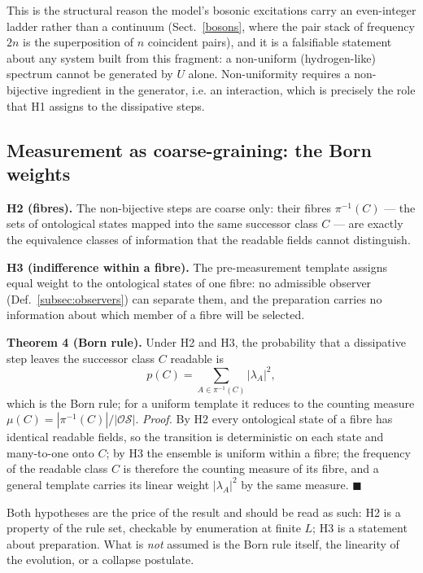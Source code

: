 This is the structural reason the model's bosonic excitations carry an
even-integer ladder rather than a continuum (Sect.~\ref{bosons}, where the pair
stack of frequency $2n$ is the superposition of $n$ coincident pairs), and it is a
falsifiable statement about any system built from this fragment: a non-uniform
(hydrogen-like) spectrum cannot be generated by $U$ alone.  Non-uniformity
requires a non-bijective ingredient in the generator, i.e. an interaction, which
is precisely the role that H1 assigns to the dissipative steps.

\subsection{Measurement as coarse-graining: the Born weights}\label{bridge:born}
\textbf{H2 (fibres).}  The non-bijective steps are coarse only: their fibres
$\pi^{-1}(C)$ --- the sets of ontological states mapped into the same successor
class $C$ --- are exactly the equivalence classes of information that the readable
fields cannot distinguish.

\textbf{H3 (indifference within a fibre).}  The pre-measurement template assigns
equal weight to the ontological states of one fibre: no admissible observer
(Def.~\ref{subsec:observers}) can separate them, and the preparation carries no
information about which member of a fibre will be selected.

\textbf{Theorem 4 (Born rule).}  Under H2 and H3, the probability that a
dissipative step leaves the successor class $C$ readable is
\begin{equation}
p(C)=\sum_{A\in\pi^{-1}(C)}|\lambda_{A}|^{2},
\label{eq:born}
\end{equation}
which is the Born rule; for a uniform template it reduces to the counting measure
$\mu(C)=|\pi^{-1}(C)|/|\mathcal{OS}|$.
\emph{Proof.}  By H2 every ontological state of a fibre has identical readable
fields, so the transition is deterministic on each state and many-to-one onto $C$;
by H3 the ensemble is uniform within a fibre; the frequency of the readable class
$C$ is therefore the counting measure of its fibre, and a general template carries
its linear weight $|\lambda_{A}|^{2}$ by the same measure. \hfill$\blacksquare$

Both hypotheses are the price of the result and should be read as such: H2 is a
property of the rule set, checkable by enumeration at finite $L$; H3 is a statement
about preparation.  What is \emph{not} assumed is the Born rule itself, the
linearity of the evolution, or a collapse postulate.

